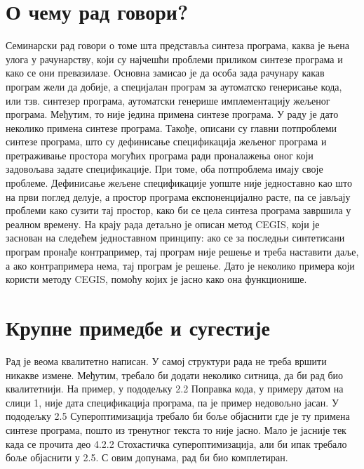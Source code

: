 \documentclass[a4paper]{report}
\begin{document}
\section{О чему рад говори?}
\par Семинарски рад говори о томе шта представља синтеза програма, каква је њена улога у рачунарству, који су најчешћи проблеми приликом синтезе програма и како се они превазилазе. Основна замисао је да особа зада рачунару какав програм жели да добије, а специјалан програм за аутоматско генерисање кода, или тзв. синтезер програма, аутоматски генерише имплементацију жељеног програма. Међутим, то није једина примена синтезе програма. У раду је дато неколико примена синтезе програма. Такође, описани су главни потпроблеми синтезе програма, што су дефинисање спецификација жељеног програма и претраживање простора могућих програма ради проналажења оног који задовољава задате спецификације. При томе, оба потпроблема имају своје проблеме. Дефинисање жељене спецификације уопште није једноставно као што на први поглед делује, а простор програма експоненцијално расте, па се јављају проблеми како сузити тај простор, како би се цела синтеза програма завршила у реалном времену. На крају рада детаљно је описан метод CEGIS, који је заснован на следећем једноставном принципу: ако се за последњи синтетисани програм пронађе контрапример, тај програм није решење и треба наставити даље, а ако контрапримера нема, тај програм је решење. Дато је неколико примера који користи методу CEGIS, помоћу којих је јасно како она функционише.

\section{Крупне примедбе и сугестије}
\par Рад је веома квалитетно написан. У самој структури рада не треба вршити никакве измене. Међутим, требало би додати неколико ситница, да би рад био квалитетнији. На пример, у пододељку 2.2 Поправка кода, у примеру датом на слици 1, није дата спецификација програма, па је пример недовољно јасан. У пододељку 2.5 Супероптимизација требало би боље објаснити где је ту примена синтезе програма, пошто из тренутног текста то није јасно. Мало је јасније тек када се прочита део 4.2.2 Стохастичка супероптимизација, али би ипак требало боље објаснити у 2.5. С овим допунама, рад би био комплетиран.
\end{document}
